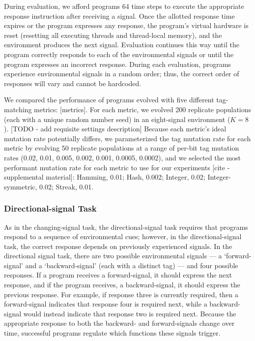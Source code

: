 During evaluation, we afford programs 64 time steps to execute the appropriate response instruction
after receiving a signal.
Once the allotted response time expires or the program expresses any response, the program's virtual
hardware is reset (resetting all executing threads and thread-local memory), and the environment produces
the next signal.
Evaluation continues this way until the program correctly responds to each of the environmental signals
or until the program expresses an incorrect response.
During each evaluation, programs experience environmental signals in a random order; thus, the correct
order of responses will vary and cannot be hardcoded.

We compared the performance of programs evolved with five different tag-matching metrics: [metrics].
For each metric, we evolved 200 replicate populations (each with a unique random number seed) in an
eight-signal environment ($K=8$).
[TODO - add requisite settings description]
Because each metric's ideal mutation rate potentially differs, we parameterized the tag mutation rate
for each metric by evolving 50 replicate populations at a range of per-bit tag mutation rates
(0.02, 0.01, 0.005, 0.002, 0.001, 0.0005, 0.0002), and we selected the most performant mutation rate
for each metric to use for our experiments [cite - supplemental material]: Hamming, 0.01; Hash, 0.002;
Integer, 0.02; Integer-symmetric, 0.02; Streak, 0.01.


\subsubsection{Directional-signal Task}

As in the changing-signal task, the directional-signal task requires that programs respond to a sequence
of environmental cues; however, in the directional-signal task, the correct response depends on previously
experienced signals.
In the directional signal task, there are two possible environmental signals --- a `forward-signal'
and a `backward-signal' (each with a distinct tag) ---  and four possible responses.
If a program receives a forward-signal, it should express the next response, and if the program receives,
a backward-signal, it should express the previous response.
For example, if response three is currently required, then a forward-signal indicates that response four
is required next, while a backward-signal would instead indicate that response two is required next.
Because the appropriate response to both the backward- and forward-signals change over time, successful
programs regulate which functions these signals trigger.

